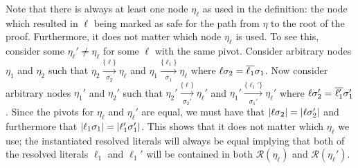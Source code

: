 Note that there is always at least one node $\eta_\ell$ as used in the definition: the node which resulted in $\ell$ being marked as safe for the path from $\eta$ to the root of the proof. Furthermore, it does not matter which node $\eta_\ell$ is used. To see this, consider some $\eta_\ell' \neq \eta_\ell$ for some $\ell$ with the same pivot. Consider arbitrary nodes $\eta_1$ and $\eta_2$ such that  $\eta_2 \xrightarrow[\sigma_2]{\{\ell\} } \eta_\ell$ and $\eta_1 \xrightarrow[\sigma_1]{\{\ell_1\} } \eta_\ell$ where $\ell\sigma_2=\overline{\ell_1}\sigma_1$. Now consider arbitrary nodes $\eta_1'$ and $\eta_2'$ such that  $\eta_2' \xrightarrow[\sigma_2']{\{\ell\} } \eta_\ell'$ and $\eta_1' \xrightarrow[\sigma_1']{\{\ell_1'\} } \eta_\ell'$ where $\ell\sigma_2'=\overline{\ell_1'}\sigma_1'$. Since the pivots for $\eta_\ell$ and $\eta_\ell'$ are equal, we must have that $\lvert\ell\sigma_2\rvert=\lvert\ell\sigma_2'\rvert$ and furthermore that $\lvert\ell_1\sigma_1\rvert=\lvert\ell_1'\sigma_1'\rvert$. This shows that it does not matter which $\eta_\ell$ we use; the instantiated resolved literals will always be equal implying that both of the resolved literals $\ell_1$ and $\ell_1'$ will be contained in both $\mathcal{R}(\eta_\ell)$ and $\mathcal{R}(\eta_\ell')$.


